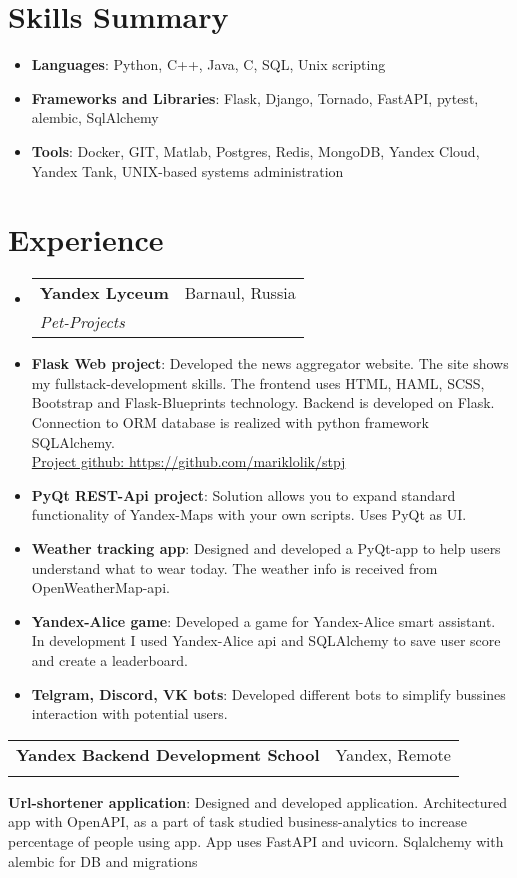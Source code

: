 \documentclass[letterpaper,10.8pt]{article}
\makeatletter
\newcommand{\resumeItem}[2]{
  \item\small{
    \textbf{#1}{: #2 \vspace{-2pt}}
  }
}
\newcommand{\resumeSubheading}[4]{
  \vspace{-1pt}\item
    \begin{tabular*}{0.97\textwidth}{l@{\extracolsep{\fill}}r}
      \textbf{#1} & #2 \\
      \textit{\small#3} & \textit{\small #4} \\
    \end{tabular*}\vspace{-5pt}
}
\newcommand{\resumeSubItem}[2]{\resumeItem{#1}{#2}\vspace{-4pt}}
\newcommand{\resumeSubHeadingListStart}{\begin{itemize}[leftmargin=*]}
\newcommand{\resumeSubHeadingListEnd}{\end{itemize}}
\newcommand{\resumeItemListEnd}{\end{itemize}\vspace{-5pt}}
\makeatother
\begin{document}
%
\section{Skills Summary}
	\resumeSubHeadingListStart
	\resumeSubItem{Languages}{ Python, C++, Java, C, SQL, Unix scripting}
    \resumeSubItem{Frameworks and Libraries}{Flask, Django, Tornado, FastAPI, pytest, alembic, SqlAlchemy}
	\resumeSubItem{Tools}{Docker, GIT, Matlab, Postgres, Redis, MongoDB, Yandex Cloud, Yandex Tank, UNIX-based systems administration}
\resumeSubHeadingListEnd



\section{Experience}
  \resumeSubHeadingListStart
    \resumeSubheading
    {Yandex Lyceum}{Barnaul, Russia}
    {Pet-Projects}{}
    \resumeItemList
        \resumeItem{Flask Web project}
          {Developed the news aggregator website. The site shows my fullstack-development skills. The frontend uses HTML, HAML, SCSS, Bootstrap and Flask-Blueprints technology. Backend is developed on Flask.
          Connection to ORM database is realized with python framework SQLAlchemy.\ }\\
        \href{https://github.com/mariklolik/stpj}{Project github: https://github.com/mariklolik/stpj}
          \resumeItem{PyQt REST-Api project}
          {Solution allows you to expand standard functionality of Yandex-Maps with your own scripts. Uses PyQt as UI.}
          \resumeItem{Weather tracking app}{Designed and developed a PyQt-app to help users understand what to wear today. The weather info is received from OpenWeatherMap-api.}
          \resumeItem{Yandex-Alice game}{Developed a game for Yandex-Alice smart assistant. In development I used Yandex-Alice api and SQLAlchemy to save user score and create a leaderboard.}
          \resumeItem{Telgram, Discord, VK bots}{Developed different bots to simplify bussines interaction with potential users. }
          
      \resumeItemListEnd
      
    \resumeSubheading
    {Yandex Backend Development School }{Yandex, Remote}
    {}{}
    \resumeItem{Url-shortener application}{Designed and developed application. 
    Architectured app with OpenAPI, as a part of task studied business-analytics to increase percentage of people using app. App uses FastAPI and uvicorn. Sqlalchemy with alembic for DB and migrations }{}
\end{document}
